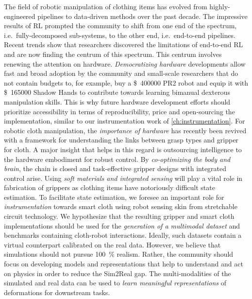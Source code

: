 \documentclass[\home/main.tex]{subfiles}
\begin{document}
The field of robotic manipulation of clothing items has evolved from highly-engineered pipelines to data-driven methods over the past decade. The impressive results of \gls{RL} prompted the community to shift from one end of the spectrum, i.e.\ fully-decomposed sub-systems, to the other end, i.e.\ end-to-end pipelines. Recent trends show that researchers discovered the limitations of end-to-end \gls{RL} and are now finding the centrum of this spectrum. 
This centrum involves renewing the attention on hardware.
\emph{Democratizing hardware} developments allow fast and broad adoption by the community and small-scale researchers that do not contain budgets to, for example, buy a \SI{400000}[\$]{} PR2 robot and equip it with \SI{165000}[\$]{} Shadow Hands to contribute towards learning bimanual dexterous manipulation skills. 
This is why future hardware development efforts should prioritize accessibility in terms of reproducibility, price and open-sourcing the implementation, similar to our instrumentation work of \cref{ch:instrumentation}. 
For robotic cloth manipulation, the \emph{importance of hardware} has recently been revived with a framework for understanding the links between grasp types and gripper for cloth.
A major insight that helps in this regard is outsourcing intelligence to the hardware embodiment for robust control. By \emph{co-optimizing the body and brain}, the chain is closed and task-effective gripper designs with integrated control arise. 
Using \emph{soft materials and integrated sensing} will play a vital role in fabrication of grippers as clothing items have notoriously difficult state estimation.
To facilitate state estimation, we foresee an important role for \emph{instrumentation} towards smart cloth using robot sensing skin from stretchable circuit technology. 
We hypothesize that the resulting gripper and smart cloth implementations should be used for the \emph{generation of a multimodal dataset} and benchmarks containing cloth-robot interactions. Ideally, such datasets contain a virtual counterpart calibrated on the real data. However, we believe that simulations should not pursue \qty{100}{\percent} realism. Rather, the community should focus on developing models and representations that help to understand and act on physics in order to reduce the Sim2Real gap. 
The multi-modalities of the simulated and real data can be used to \emph{learn meaningful representations} of deformations for downstream tasks.
\end{document}
